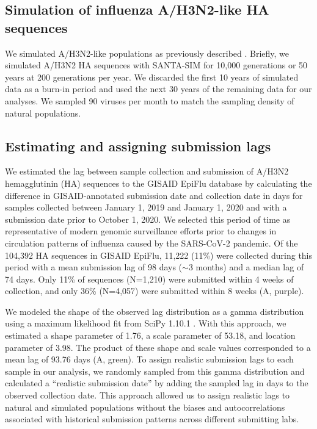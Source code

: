 \documentclass[9pt,lineno]{elife}
\begin{document}
\subsection{Simulation of influenza A/H3N2-like HA sequences}

We simulated A/H3N2-like populations as previously described \citep{Huddleston2020}.
Briefly, we simulated A/H3N2 HA sequences with SANTA-SIM \citep{Jariani2019} for 10,000 generations or 50 years at 200 generations per year.
We discarded the first 10 years of simulated data as a burn-in period and used the next 30 years of the remaining data for our analyses.
We sampled 90 viruses per month to match the sampling density of natural populations.

\subsection{Estimating and assigning submission lags}

We estimated the lag between sample collection and submission of A/H3N2 hemagglutinin (HA) sequences to the GISAID EpiFlu database \citep{gisaid} by calculating the difference in GISAID-annotated submission date and collection date in days for samples collected between January 1, 2019 and January 1, 2020 and with a submission date prior to October 1, 2020.
We selected this period of time as representative of modern genomic surveillance efforts prior to changes in circulation patterns of influenza caused by the SARS-CoV-2 pandemic.
Of the 104,392 HA sequences in GISAID EpiFlu, 11,222 (11\%) were collected during this period with a mean submission lag of 98 days ($\sim$3 months) and a median lag of 74 days.
Only 11\% of sequences (N=1,210) were submitted within 4 weeks of collection, and only 36\% (N=4,057) were submitted within 8 weeks (A, purple).

We modeled the shape of the observed lag distribution as a gamma distribution using a maximum likelihood fit from SciPy 1.10.1 \citep{scipy}.
With this approach, we estimated a shape parameter of 1.76, a scale parameter of 53.18, and location parameter of 3.98.
The product of these shape and scale values corresponded to a mean lag of 93.76 days (A, green).
To assign realistic submission lags to each sample in our analysis, we randomly sampled from this gamma distribution and calculated a ``realistic submission date'' by adding the sampled lag in days to the observed collection date.
This approach allowed us to assign realistic lags to natural and simulated populations without the biases and autocorrelations associated with historical submission patterns across different submitting labs.
\end{document}
